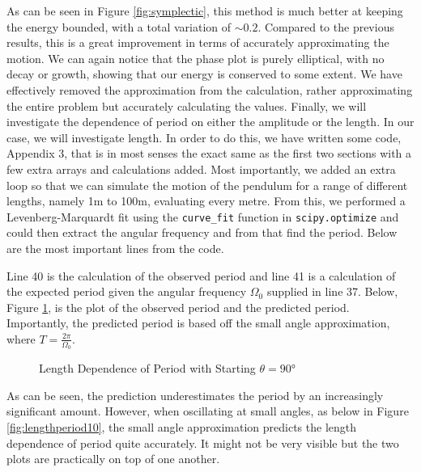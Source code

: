 \documentclass[12pt]{article}
\begin{document}
    \noindent
    As can be seen in Figure \ref{fig:symplectic}, this method is much better at keeping the 
    energy bounded, with a total variation of $\sim 0.2$. Compared to the previous results, 
    this is a great improvement in terms of accurately approximating the motion. We can again 
    notice that the phase plot is purely elliptical, with no decay or growth, showing that our 
    energy is conserved to some extent. We have effectively removed the approximation from the 
    calculation, rather approximating the entire problem but accurately calculating the values. 
    \newline
    \newline
    Finally, we will investigate the dependence of period on either the amplitude or the length. 
    In our case, we will investigate length. In order to do this, we have written some code, 
    Appendix 3, that is in most senses the exact same as the first two sections with a few extra 
    arrays and calculations added. Most importantly, we added an extra loop so that we can simulate 
    the motion of the pendulum for a range of different lengths, namely 1m to 100m, evaluating every 
    metre. From this, we performed a Levenberg-Marquardt fit using the \texttt{curve\_fit} function 
    in \texttt{scipy.optimize} and could then extract the angular frequency and from that find the 
    period. Below are the most important lines from the code.
    \newline
    
    
    \noindent
    Line 40 is the calculation of the observed period and line 41 is a calculation of the expected 
    period given the angular frequency $\Omega_0$ supplied in line 37. Below, Figure \ref{fig:lengthperiod90}, 
    is the plot of the observed period and the predicted period. Importantly, the predicted period is 
    based off the small angle approximation, where $T = \frac{2\pi}{\Omega_0}$.

    \begin{figure}[H]
        \begin{center}
           \scalebox{.7}{}
           \caption{Length Dependence of Period with Starting $\theta = \ang{90}$}
           \label{fig:lengthperiod90}
        \end{center}
    \end{figure}

    \noindent
    As can be seen, the prediction underestimates the period by an increasingly significant amount. 
    However, when oscillating at small angles, as below in Figure \ref{fig:lengthperiod10}, the 
    small angle approximation predicts the length dependence of period quite accurately. It might not 
    be very visible but the two plots are practically on top of one another.
\end{document}
